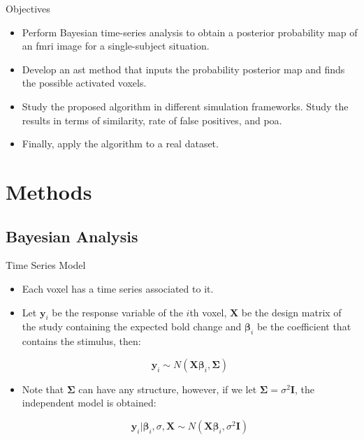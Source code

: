 \documentclass{beamer}
\begin{document}
\begin{frame}{Objectives}
\begin{itemize}
\item Perform Bayesian time-series analysis to obtain a posterior probability 
map of an \gls{fmri} image for a single-subject situation.
\item Develop an \gls{ast} method that inputs the probability posterior map 
and finds the possible activated voxels.
\item Study the proposed algorithm in different simulation frameworks. Study 
the results in terms of similarity, rate of false positives, and \gls{poa}.
\item Finally, apply the algorithm to a real dataset.
\end{itemize}
\end{frame}

\section{Methods}

\subsection{Bayesian Analysis}

\begin{frame}{Time Series Model}
\begin{itemize}
\item Each voxel has a time series associated to it.
\item Let $\bm{y}_i$ be the response variable of the $i$th voxel, $\bm{X}$ 
be the design matrix of the study containing the expected \gls{bold} change and 
$\bm{\beta}_i$ be the coefficient that contains the stimulus, then:

$$ \bm{y}_i \sim N \left( \bm{X} \bm{\beta}_i , \bm{\Sigma} \right)$$

\item Note that $\bm{\Sigma}$ can have any structure, however, if we 
let $\bm{\Sigma} = \sigma^2 \bm{I}$, the independent model is obtained:

$$ \bm{y}_i|\bm{\beta}_i, \sigma, \bm{X} \sim N \left( \bm{X} \bm{\beta}_i,\sigma^2\bm{I} \right) $$
\end{itemize}
\end{frame}
\end{document}

